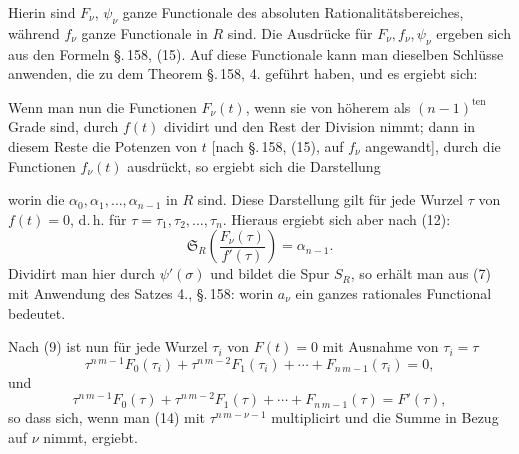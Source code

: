 Hierin sind $F_\nu$, $\psi_\nu$ ganze Functionale des absoluten Rationalitätsbereiches,
während $f_\nu$ ganze Functionale in $R$ sind. Die Ausdrücke für $F_\nu, f_\nu, \psi_\nu$
ergeben sich aus den Formeln \S.\,158, (15). Auf diese Functionale kann man dieselben
Schlüsse anwenden, die zu dem Theorem \S.\,158, 4. geführt haben, und es ergiebt sich:

Wenn man nun die Functionen $F_\nu(t)$, wenn sie von höherem als $(n-1)^{\mathrm{ten}}$
Grade sind, durch $f(t)$ dividirt und den Rest der Division nimmt; dann in diesem Reste
die Potenzen von $t$ [nach \S.\,158, (15), auf $f_\nu$ angewandt], durch die Functionen
$f_\nu(t)$ ausdrückt, so ergiebt sich die Darstellung

worin die $\alpha_0, \alpha_1, \ldots, \alpha_{n-1}$  in $R$ sind. Diese
Darstellung gilt für jede Wurzel $\tau$ von $f(t) = 0$, d.\,h. für $\tau = \tau_1, \tau_2,
\ldots, \tau_n$. Hieraus ergiebt sich aber nach (12):
\[
\mathfrak{S}_R \left( \frac{F_\nu(\tau)}{f'(\tau)} \right) = \alpha_{n-1}.
\]
Dividirt man hier durch $\psi'(\sigma)$ und bildet die Spur $S_R$, so erhält man aus (7)
mit Anwendung des Satzes 4., \S.\,158:
worin $a_\nu$ ein ganzes rationales Functional bedeutet.

Nach (9) ist nun für jede Wurzel $\tau_i$ von $F(t) = 0$ mit Ausnahme von $\tau_i = \tau$
\[
\tau^{n\,m-1} F_0(\tau_i) + \tau^{n\,m-2} F_1(\tau_i) + \cdots + F_{n\,m-1}(\tau_i) = 0,
\]
und
\[
\tau^{n\,m-1} F_0(\tau) + \tau^{n\,m-2} F_1(\tau) + \cdots + F_{n\,m-1}(\tau) = F'(\tau),
\]
so dass sich, wenn man (14) mit $\tau^{n\,m-\nu-1}$ multiplicirt und die Summe in Bezug
auf $\nu$ nimmt,
ergiebt. 
